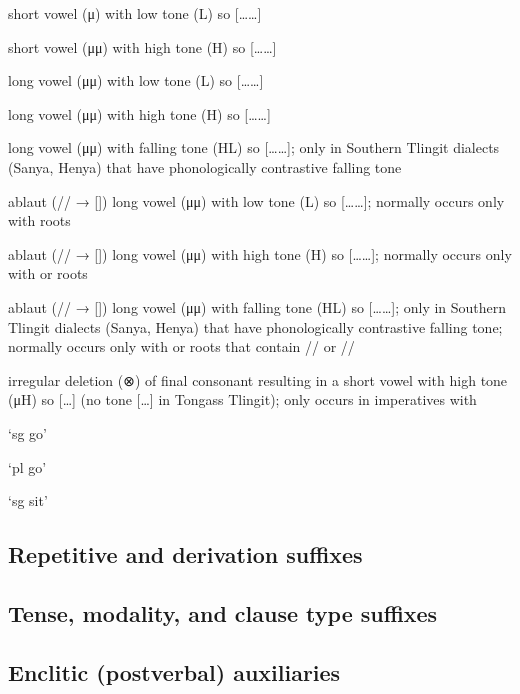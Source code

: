 \begin{morphdesc}
\item[\X{-μL}]
	short vowel (μ) with low tone (L) so [……]

\item[\X{-μH}]
	short vowel (μμ) with high tone (H) so [……]

\item[\X{-μμL}]
	long vowel (μμ) with low tone (L) so [……]

\item[\X{-μμH}]
	long vowel (μμ) with high tone (H) so [……]

\item[\X{-μμHL}]
	long vowel (μμ) with falling tone (HL) so [……];
	only in Southern Tlingit dialects (Sanya, Henya) that have phonologically
		contrastive falling tone

\item[\X{-μᵉμL}]
	ablaut (// → []) long vowel (μμ)
		with low tone (L) so [……];
	normally occurs only with  roots

\item[\X{-μᵉμH}]
	ablaut (// → []) long vowel (μμ)
		with high tone (H) so [……];
	normally occurs only with  or  roots

\item[\X{-μᵉμHL}]
	ablaut (// → []) long vowel (μμ)
		with falling tone (HL) so [……];
	only in Southern Tlingit dialects (Sanya, Henya) that have phonologically
		contrastive falling tone;
	normally occurs only with  or  roots
		that contain // or //

\item[{\X[-DEL]{-⊗}}]
	irregular deletion (⊗) of final consonant
		resulting in a short vowel with high tone (μH)
		so […]
		(no tone […] in Tongass Tlingit);
	only occurs in imperatives with
		\begin{inlinelist}
		\item	{} ‘sg go’
		\item	{} ‘pl go’
		\item	{} ‘sg sit’
		\end{inlinelist}
\end{morphdesc}

\subsection{Repetitive and derivation suffixes}\label{sec:inventory-repderiv}

\subsection{Tense, modality, and clause type suffixes}\label{sec:inventory-tmc}

\subsection{Enclitic (postverbal) auxiliaries}\label{sec:inventory-aux}
